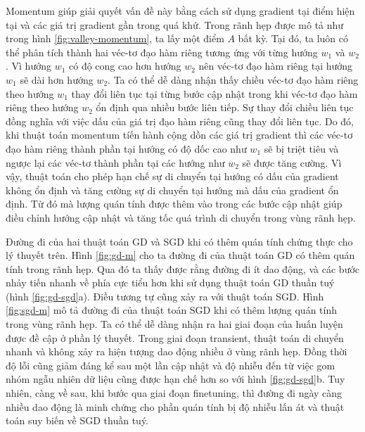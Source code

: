 Momentum giúp giải quyết vấn đề này bằng cách sử dụng gradient tại điểm hiện tại và các giá trị gradient gần trong quá khứ. Trong rãnh hẹp được mô tả như trong hình \ref{fig:valley-momentum}, ta lấy một điểm $A$ bất kỳ. Tại đó, ta luôn có thể phân tích thành hai véc-tơ đạo hàm riêng tương ứng với từng hướng $w_1$ và $w_2$. Vì hướng $w_1$ có độ cong cao hơn hướng $w_2$ nên véc-tơ đạo hàm riêng tại hướng $w_1$ sẽ dài hơn hướng $w_2$. Ta có thể dễ dàng nhận thấy chiều véc-tơ đạo hàm riêng theo hướng $w_1$ thay đổi liên tục tại từng bước cập nhật trong khi véc-tơ đạo hàm riêng theo hướng $w_2$ ổn định qua nhiều bước liên tiếp. Sự thay đổi chiều liên tục đồng nghĩa với việc dấu của giá trị đạo hàm riêng cũng thay đổi liên tục. Do đó, khi thuật toán momentum tíến hành cộng dồn các giá trị gradient thì các véc-tơ đạo hàm riêng thành phần tại hướng có độ dốc cao như $w_1$ sẽ bị triệt tiêu và ngược lại các véc-tơ thành phần tại các hướng như $w_2$ sẽ được tăng cường. Vì vậy, thuật toán cho phép hạn chế sự di chuyển tại hướng có dấu của gradient không ổn định và tăng cường sự di chuyển tại hướng mà dấu của gradient ổn định. Từ đó mà lượng quán tính được thêm vào trong các bước cập nhật giúp điều chỉnh hướng cập nhật và tăng tốc quá trình di chuyển trong vùng rãnh hẹp.

Đường đi của hai thuật toán GD và SGD khi có thêm quán tính chứng thực cho lý thuyết trên. Hình \ref{fig:gd-m} cho ta đường đi của thuật toán GD có thêm quán tính trong rãnh hẹp. Qua đó ta thấy được rằng đường đi ít dao động, và các bước nhảy tiến nhanh về phía cực tiểu hơn khi sử dụng thuật toán GD thuần tuý (hình \ref{fig:gd-sgd}a). Điều tương tự cũng xảy ra với thuật toán SGD. Hình \ref{fig:sgd-m} mô tả đường đi của thuật toán SGD khi có thêm lượng quán tính trong vùng rãnh hẹp. Ta có thể dễ dàng nhận ra hai giai đoạn của huấn luyện được đề cập ở phần lý thuyết. Trong giai đoạn transient, thuật toán di chuyển nhanh và không xảy ra hiện tượng dao động nhiều ở vùng rãnh hẹp. Đồng thời độ lỗi cũng giảm đáng kể sau một lần cập nhật và độ nhiễu đến từ việc gom nhóm ngẫu nhiên dữ liệu cũng được hạn chế hơn so với hình \ref{fig:gd-sgd}b. Tuy nhiên, càng về sau, khi bước qua giai đoạn finetuning, thì đường đi ngày càng nhiều dao động là minh chứng cho phần quán tính bị độ nhiễu lấn át và thuật toán suy biến về SGD thuần tuý.

